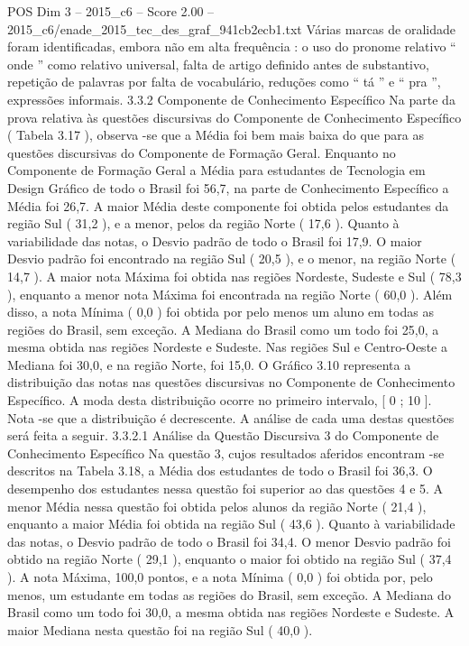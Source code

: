 \begin{textsample}{POS Dim 3 – 2015\_c6 – Score 2.00 – 2015\_c6/enade\_2015\_tec\_des\_graf\_941cb2ecb1.txt}
Várias marcas de oralidade foram identificadas, embora não em alta frequência : o uso do pronome relativo “ onde ” como relativo universal, falta de artigo definido antes de substantivo, repetição de palavras por falta de vocabulário, reduções como “ tá ” e “ pra ”, expressões informais. 3.3.2 Componente de Conhecimento Específico Na parte da prova relativa às questões discursivas do Componente de Conhecimento Específico ( Tabela 3.17 ), observa -se que a Média foi bem mais baixa do que para as questões discursivas do Componente de Formação Geral.
Enquanto no Componente de Formação Geral a Média para estudantes de Tecnologia em Design Gráfico de todo o Brasil foi 56,7, na parte de Conhecimento Específico a Média foi 26,7.
A maior Média deste componente foi obtida pelos estudantes da região Sul ( 31,2 ), e a menor, pelos da região Norte ( 17,6 ).
Quanto à variabilidade das notas, o Desvio padrão de todo o Brasil foi 17,9.
O maior Desvio padrão foi encontrado na região Sul ( 20,5 ), e o menor, na região Norte ( 14,7 ).
A maior nota Máxima foi obtida nas regiões Nordeste, Sudeste e Sul ( 78,3 ), enquanto a menor nota Máxima foi encontrada na região Norte ( 60,0 ).
Além disso, a nota Mínima ( 0,0 ) foi obtida por pelo menos um aluno em todas as regiões do Brasil, sem exceção.
A Mediana do Brasil como um todo foi 25,0, a mesma obtida nas regiões Nordeste e Sudeste.
Nas regiões Sul e Centro-Oeste a Mediana foi 30,0, e na região Norte, foi 15,0.
O Gráfico 3.10 representa a distribuição das notas nas questões discursivas no Componente de Conhecimento Específico.
A moda desta distribuição ocorre no primeiro intervalo, [ 0 ; 10 ].
Nota -se que a distribuição é decrescente.
A análise de cada uma destas questões será feita a seguir. 3.3.2.1 Análise da Questão Discursiva 3 do Componente de Conhecimento Específico Na questão 3, cujos resultados aferidos encontram -se descritos na Tabela 3.18, a Média dos estudantes de todo o Brasil foi 36,3.
O desempenho dos estudantes nessa questão foi superior ao das questões 4 e 5.
A menor Média nessa questão foi obtida pelos alunos da região Norte ( 21,4 ), enquanto a maior Média foi obtida na região Sul ( 43,6 ).
Quanto à variabilidade das notas, o Desvio padrão de todo o Brasil foi 34,4.
O menor Desvio padrão foi obtido na região Norte ( 29,1 ), enquanto o maior foi obtido na região Sul ( 37,4 ).
A nota Máxima, 100,0 pontos, e a nota Mínima ( 0,0 ) foi obtida por, pelo menos, um estudante em todas as regiões do Brasil, sem exceção.
A Mediana do Brasil como um todo foi 30,0, a mesma obtida nas regiões Nordeste e Sudeste.
A maior Mediana nesta questão foi na região Sul ( 40,0 ).

\end{textsample}
